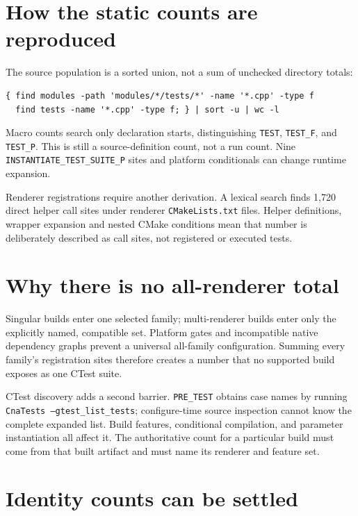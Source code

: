 \section{How the static counts are reproduced}

The source population is a sorted union, not a sum of unchecked directory totals:

\begin{verbatim}
{ find modules -path 'modules/*/tests/*' -name '*.cpp' -type f
  find tests -name '*.cpp' -type f; } | sort -u | wc -l
\end{verbatim}

Macro counts search only declaration starts, distinguishing \texttt{TEST}, \texttt{TEST\_F},
and \texttt{TEST\_P}.  This is still a source-definition count, not a run count.  Nine
\texttt{INSTANTIATE\_TEST\_SUITE\_P} sites and platform conditionals can change runtime
expansion.

Renderer registrations require another derivation.  A lexical search finds 1,720 direct helper
call sites under renderer \texttt{CMakeLists.txt} files.  Helper definitions, wrapper expansion
and nested CMake conditions mean that number is deliberately described as call sites, not
registered or executed tests.

\section{Why there is no all-renderer total}

Singular builds enter one selected family; multi-renderer builds enter only the explicitly named,
compatible set.  Platform gates and incompatible native dependency graphs prevent a universal
all-family configuration.  Summing every family's registration sites therefore creates a number
that no supported build exposes as one CTest suite.

CTest discovery adds a second barrier.  \texttt{PRE\_TEST} obtains case names by running
\texttt{CnaTests --gtest\_list\_tests}; configure-time source inspection cannot know the complete
expanded list.  Build features, conditional compilation, and parameter instantiation all affect
it.  The authoritative count for a particular build must come from that built artifact and must
name its renderer and feature set.

\section{Identity counts can be settled}

